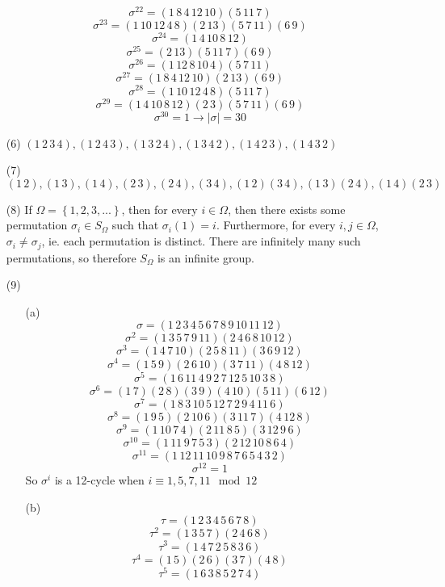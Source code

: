 \documentclass[12pt]{article}
\begin{document}
\begin{itemize}
$$\sigma^{22} = (1 \, 8 \, 4 \, 12 \, 10)(5 \, 11 \, 7)$$
$$\sigma^{23} = (1 \, 10 \, 12 \, 4 \, 8)(2 \, 13)(5 \, 7 \, 11)(6 \, 9)$$
$$\sigma^{24} = (1 \, 4 \, 10 \, 8 \, 12)$$
$$\sigma^{25} = (2 \, 13)(5 \, 11 \, 7)(6 \, 9)$$
$$\sigma^{26} = (1 \, 12 \, 8 \, 10 \, 4)(5 \, 7 \, 11)$$
$$\sigma^{27} = (1 \, 8 \, 4 \, 12 \, 10)(2 \, 13)(6 \, 9)$$
$$\sigma^{28} = (1 \, 10 \, 12 \, 4 \, 8)(5 \, 11 \, 7)$$
$$\sigma^{29} = (1 \, 4 \, 10 \, 8 \, 12)(2 \, 3)(5 \, 7 \, 11)(6 \, 9)$$
$$\sigma^{30} = 1 \rightarrow |\sigma| = 30$$
\item[(6)]
$(1 \, 2 \, 3 \, 4), (1 \, 2 \, 4 \, 3), (1 \, 3 \, 2 \, 4), (1 \, 3 \, 4 \, 2), (1 \, 4 \, 2 \, 3), (1 \, 4 \, 3 \, 2)$
\item[(7)]
$(1 \, 2), (1 \, 3), (1 \, 4), (2 \, 3), (2 \, 4), (3 \, 4), (1 \, 2)(3 \, 4), (1 \, 3)(2 \, 4), (1 \, 4)(2 \, 3)$
\item[(8)]
If $\Omega = \left\lbrace 1, 2, 3, ... \right\rbrace$, then for every $i \in \Omega$, then there exists some permutation $\sigma_i \in S_\Omega$ such that $\sigma_i(1) = i$. Furthermore, for every $i, j \in \Omega$, $\sigma_i \neq \sigma_j$, ie. each permutation is distinct. There are infinitely many such permutations, so therefore $S_\Omega$ is an infinite group.
\item[(9)]
\begin{itemize}
\item[(a)]
$$\sigma = (1 \, 2 \, 3 \, 4 \, 5 \, 6 \, 7 \, 8 \, 9 \, 10 \, 11 \, 12)$$
$$\sigma^2 = (1 \, 3 \, 5 \, 7 \, 9 \, 11)(2 \, 4 \, 6 \, 8 \, 10 \, 12)$$
$$\sigma^3 = (1 \, 4 \, 7 \, 10)(2 \, 5 \, 8 \, 11)(3 \, 6 \, 9 \, 12)$$
$$\sigma^4 = (1 \, 5 \, 9)(2 \, 6 \, 10)(3 \, 7 \, 11)(4 \, 8 \, 12)$$
$$\sigma^5 = (1 \, 6 \, 11 \, 4 \, 9 \, 2 \, 7 \, 12 \, 5 \, 10 \, 3 \, 8)$$
$$\sigma^6 = (1 \, 7)(2 \, 8)(3 \, 9)(4 \, 10)(5 \, 11)(6 \, 12)$$
$$\sigma^7 = (1\, 8 \, 3 \, 10 \, 5 \, 12 \, 7 \, 2 \, 9 \, 4 \, 11 \, 6)$$
$$\sigma^8 = (1 \, 9 \, 5)(2 \, 10 \, 6)(3 \, 11 \, 7)(4 \, 12 \, 8)$$
$$\sigma^9 = (1 \, 10 \, 7 \, 4)(2 \, 11 \, 8 \, 5)(3 \, 12 \, 9 \, 6)$$
$$\sigma^{10} = (1 \, 11 \, 9 \, 7 \, 5 \, 3)(2 \, 12 \, 10 \, 8 \, 6 \, 4)$$
$$\sigma^{11} = (1 \, 12 \, 11 \, 10 \, 9 \, 8 \, 7 \, 6 \, 5 \, 4 \, 3 \, 2)$$
$$\sigma^{12} = 1$$
So $\sigma^i$ is a 12-cycle when $i \equiv 1, 5, 7, 11 \mod 12$
\item[(b)]
$$\tau = (1 \, 2 \, 3 \, 4 \, 5 \, 6 \, 7 \, 8)$$
$$\tau^2 = (1 \, 3 \, 5 \, 7)(2 \, 4 \, 6 \, 8)$$
$$\tau^3 = (1 \, 4 \, 7 \, 2 \, 5 \, 8 \, 3 \, 6)$$
$$\tau^4 = (1 \, 5)(2 \, 6)(3 \, 7)(4 \, 8)$$
$$\tau^5 = (1 \, 6 \, 3 \, 8 \, 5 \, 2 \, 7 \, 4)$$

\end{itemize}
\end{itemize}
\end{document}
